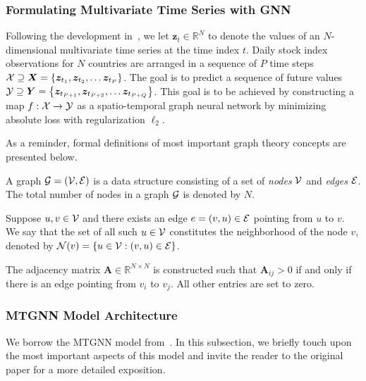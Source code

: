 \subsubsection{Formulating Multivariate Time Series with GNN}
%
Following the development in~\cite{wu2020connecting}, we let $\bm{z}_t \in \mathbb{R}^N$ to denote the 
values of an $N$-dimensional multivariate time series at the time index $t$. Daily stock index observations
for $N$ countries are arranged in a sequence of $P$ time steps $\mathcal{X} \supseteq \bm{X} = 
\left\{\bm{z}_{t_1}, \bm{z}_{t_2}, \ldots \bm{z}_{t_P}\right\}$. The goal is to predict a sequence of
future values $\mathcal{Y} \supseteq \bm{Y} = \left\{\bm{z}_{t_{P+1}}, \bm{z}_{t_{P+2}}, \ldots \bm{z}_{t_{P+Q}}\right\}$. 
This goal is to be achieved by constructing a map $f: \mathcal{X} \rightarrow \mathcal{Y}$ as a spatio-temporal 
graph neural network by minimizing absolute loss with regularization $\ell_2$.

As a reminder, formal definitions of most important graph theory concepts are presented below.

\begin{defn}[Graph]
   A graph $\mathcal{G} = (\mathcal{V}, \mathcal{E})$ is a data structure consisting of a set of \textit{nodes} $\mathcal{V}$ 
   and \textit{edges} $\mathcal{E}$. The total number of nodes in a graph $\mathcal{G}$ is denoted by $N$.
\end{defn}

\begin{defn}[Neighborhood]
   Suppose $u, v \in \mathcal{V}$ and there exists an edge $e = (v, u) \in \mathcal{E}$ pointing from $u$ to $v$. 
   We say that the set of all such $u \in \mathcal{V}$ constitutes the neighborhood of the node $v$, denoted by $\mathcal{N}(v) = \{ u \in \mathcal{V}: (v, u) \in \mathcal{E}\}$.
\end{defn}

\begin{defn}
    The adjacency matrix $\bm{A} \in \mathbb{R}^{N \times N}$ is constructed such that $\bm{A}_{ij} > 0$ if 
    and only if there is an edge pointing from $v_i$ to $v_j$. All other entries are set to zero.
\end{defn}

\subsubsection{MTGNN Model Architecture}

We borrow the MTGNN model from~\cite{wu2020connecting}. In this subsection, we briefly touch upon the 
most important aspects of this model and invite the reader to the original paper for a more detailed 
exposition.

